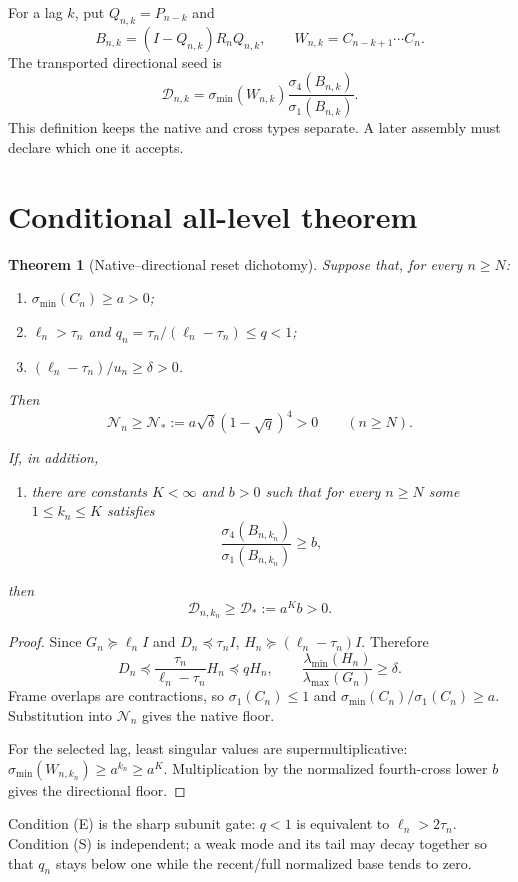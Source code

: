 \documentclass[12pt]{article}
\newtheorem{theorem}{Theorem}
\newcommand{\smin}{\sigma_{\min}}
\begin{document}
For a lag $k$, put $Q_{n,k}=P_{n-k}$ and
\[
 B_{n,k}=(I-Q_{n,k})R_nQ_{n,k},\qquad
 W_{n,k}=C_{n-k+1}\cdots C_n.
\]
The transported directional seed is
\[
 \mathcal D_{n,k}=\smin(W_{n,k})
 \frac{\sigma_4(B_{n,k})}{\sigma_1(B_{n,k})}.
\]
This definition keeps the native and cross types separate.  A later assembly
must declare which one it accepts.

\section{Conditional all-level theorem}
\begin{theorem}[Native--directional reset dichotomy]\label{thm:dichotomy}
Suppose that, for every $n\geq N$:
\begin{enumerate}
\item[\textnormal{(O)}] $\smin(C_n)\geq a>0$;
\item[\textnormal{(E)}] $\ell_n>\tau_n$ and
$q_n=\tau_n/(\ell_n-\tau_n)\leq q<1$;
\item[\textnormal{(S)}] $(\ell_n-\tau_n)/u_n\geq\delta>0$.
\end{enumerate}
Then
\[
 \mathcal N_n\geq
 \mathcal N_*:=a\sqrt\delta(1-\sqrt q)^4>0
 \qquad(n\geq N).
\]

If, in addition,
\begin{enumerate}
\item[\textnormal{(L)}] there are constants $K<\infty$ and $b>0$ such that
for every $n\geq N$ some $1\leq k_n\leq K$ satisfies
\[
 \frac{\sigma_4(B_{n,k_n})}{\sigma_1(B_{n,k_n})}\geq b,
\]
\end{enumerate}
then
\[
 \mathcal D_{n,k_n}\geq\mathcal D_*:=a^Kb>0.
\]
\end{theorem}
\begin{proof}
Since $G_n\succeq\ell_nI$ and $D_n\preceq\tau_nI$,
$H_n\succeq(\ell_n-\tau_n)I$.  Therefore
\[
 D_n\preceq \frac{\tau_n}{\ell_n-\tau_n}H_n\preceq qH_n,
 \qquad
 \frac{\lambda_{\min}(H_n)}{\lambda_{\max}(G_n)}\geq\delta.
\]
Frame overlaps are contractions, so $\sigma_1(C_n)\leq1$ and
$\smin(C_n)/\sigma_1(C_n)\geq a$.  Substitution into $\mathcal N_n$ gives
the native floor.

For the selected lag, least singular values are supermultiplicative:
$\smin(W_{n,k_n})\geq a^{k_n}\geq a^K$.  Multiplication by the normalized
fourth-cross lower $b$ gives the directional floor.
\end{proof}

Condition (E) is the sharp subunit gate: $q<1$ is equivalent to
$\ell_n>2\tau_n$.  Condition (S) is independent; a weak mode and its tail may
decay together so that $q_n$ stays below one while the recent/full normalized
base tends to zero.
\end{document}

